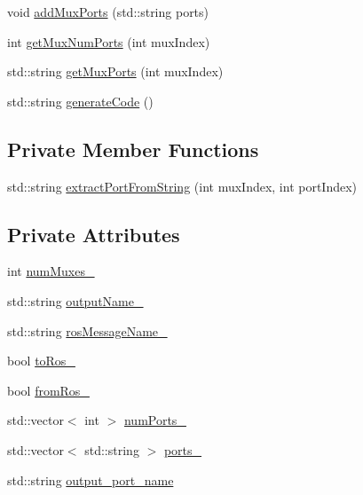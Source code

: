 \begin{DoxyCompactItemize}
\item 
void \hyperlink{classPortMuxGenerator_ac1899aadf7ded799355b58efe03f4ce2}{add\-Mux\-Ports} (std\-::string ports)
\item 
int \hyperlink{classPortMuxGenerator_a8abf12f10f752f2919e34fab9855770a}{get\-Mux\-Num\-Ports} (int mux\-Index)
\item 
std\-::string \hyperlink{classPortMuxGenerator_a17cd5018bbe6c9bc5e2ceca94375a1af}{get\-Mux\-Ports} (int mux\-Index)
\item 
std\-::string \hyperlink{classPortMuxGenerator_a0f740d798c16c0dee5de7b6fbace3c53}{generate\-Code} ()
\end{DoxyCompactItemize}
\subsection*{Private Member Functions}
\begin{DoxyCompactItemize}
\item 
std\-::string \hyperlink{classPortMuxGenerator_a3fdfcabf997e4f8d89a42776c0a1c2bc}{extract\-Port\-From\-String} (int mux\-Index, int port\-Index)
\end{DoxyCompactItemize}
\subsection*{Private Attributes}
\begin{DoxyCompactItemize}
\item 
int \hyperlink{classPortMuxGenerator_a48cec4ed3c40d0fb987a85dbcb2f02ac}{num\-Muxes\-\_\-}
\item 
std\-::string \hyperlink{classPortMuxGenerator_a6c459791ee05d68f48e087b4d3cedc68}{output\-Name\-\_\-}
\item 
std\-::string \hyperlink{classPortMuxGenerator_a78f4039de899ad9af05bb7d72cf310b7}{ros\-Message\-Name\-\_\-}
\item 
bool \hyperlink{classPortMuxGenerator_ada967c8c94e76a6b73598e77b039086b}{to\-Ros\-\_\-}
\item 
bool \hyperlink{classPortMuxGenerator_ab3876f874fe7230a5585d203cda2ff3b}{from\-Ros\-\_\-}
\item 
std\-::vector$<$ int $>$ \hyperlink{classPortMuxGenerator_addec6f43a703f42fe99a3fc8f877dd1d}{num\-Ports\-\_\-}
\item 
std\-::vector$<$ std\-::string $>$ \hyperlink{classPortMuxGenerator_a05ea2374bbae5e1c1bb069a793a3685e}{ports\-\_\-}
\item 
std\-::string \hyperlink{classPortMuxGenerator_a8a342f9a1ea4fea5be14d05f0ff4b251}{output\-\_\-port\-\_\-name}
\end{DoxyCompactItemize}


